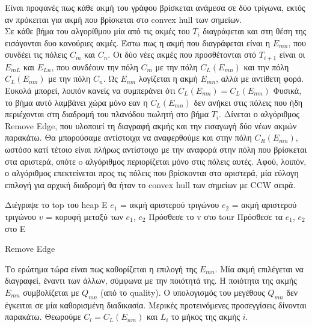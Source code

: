 \documentclass[oneside,12pt]{book}
\theoremstyle{definition}
\begin{document}
Είναι προφανές πως κάθε ακμή του γράφου βρίσκεται ανάμεσα σε δύο τρίγωνα, εκτός αν πρόκειται για ακμή που βρίσκεται στο convex hull των σημείων. \\

Σε κάθε βήμα του αλγορίθμου μία από τις ακμές του \(T_i\) διαγράφεται και στη θέση της εισάγονται δυο κανούριες ακμές. Έστω πως η ακμή που διαγράφεται είναι η \(E_{mn}\), που συνδέει τις πόλεις \(C_m\) και \(C_n\). Οι δύο νέες ακμές που προσθέτονται στό \(Τ_{i+1}\) είναι οι \(E_{mL}\) και \(E_{Ln}\), που συνδέουν την πόλη \(C_m\) με την πόλη \(C_L(E_{mn})\) και την πόλη \(C_L(E_{nm})\) με την πόλη \(C_n\). Ως \(E_{nm}\) λογίζεται η ακμή \(E_{mn}\), αλλά με αντίθετη φορά. Ευκολά μπορεί, λοιπόν κανείς να συμπεράνει ότι \(C_L(E_{mn}) = C_L(E_{nm})\) Φυσικά, το βήμα αυτό λαμβάνει χώρα μόνο εαν η \(C_L(E_{mn})\) δεν ανήκει στις πόλεις που ήδη περιέχονται στη διαδρομή του πλανόδου πωλητή στο βήμα \(T_i\). Δίνεται ο αλγόριθμος Remove Edge, που υλοποιεί τη διαγραφή ακμής και την εισαγωγή δύο νέων ακμών παρακάτω. Θα μπορούσαμε αντίστοιχα να αναφερθούμε και στην πόλη \(C_R(E_{mn})\), ωστόσο κατί τέτοιο είναι πλήρως αντίστοιχο με την αναφορά στην πόλη που βρίσκεται στα αριστερά, οπότε o αλγόριθμος περιορίζεται μόνο στις πόλεις αυτές. Αφού, λοιπόν, ο αλγόριθμος επεκτείνεται προς τις πόλεις που βρίσκονται στα αριστερά, μία εύλογη επιλογή για αρχική διαδρομή θα ήταν το convex hull των σημείων με CCW σειρά. \\

\begin{algorithm}[H]
	\SetAlgoLined
	
	Διέγραψε το top του heap Ε \;
	\(e_1\) = ακμή αριστερού τριγώνου \;
	\(e_2\) = ακμή αριστερού τριγώνου \;	
	\(v\) = κορυφή μεταξύ των \(e_1\), \(e_2\) \;
	Πρόσθεσε το v στο tour \;
	Πρόσθεσε τα \(e_1\), \(e_2\) στο Ε \;
	
	\caption{Remove Edge}
\end{algorithm}

Το ερώτημα τώρα είναι πως καθορίζεται η επιλογή της \(E_{mn}\). Μία ακμή επιλέγεται να διαγραφεί, έναντι των άλλων, σύμφωνα με την ποιότητά της. Η ποιότητα της ακμής \(E_{mn}\) συμβολίζεται με \(Q_{mn}\) (από το quality). Ο υπολογισμός του μεγέθους \(Q_{mn}\) δεν έγκειται σε μία καθορισμένη διαδικασία. Μερικές προτεινόμενες προσεγγίσεις δίνονται παρακάτω. Θεωρούμε \(C_l = C_L(E_{nm})\) και \(L_i\) το μήκος της ακμής \(i\). \\
\end{document}
